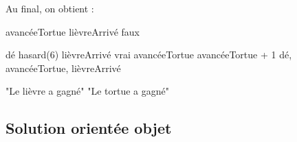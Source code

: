 			Au final, on obtient :
			\begin{LDA}

					\Empty
					\Let avancéeTortue 
					\Let lièvreArrivé \Gets faux
					
					\Empty
						\Let dé \Gets hasard(6)
							\Let lièvreArrivé \Gets vrai
						\Else
							\Let avancéeTortue \Gets avancéeTortue + 1
						\EndIf
						\Write dé, avancéeTortue, lièvreArrivé
					\EndWhile

					\Empty
						\Write "Le lièvre a gagné"
					\Else
						\Write "Le tortue a gagné"
					\EndIf
				\EndAlgo
			\end{LDA}

	\subsection{Solution orientée objet}
		
